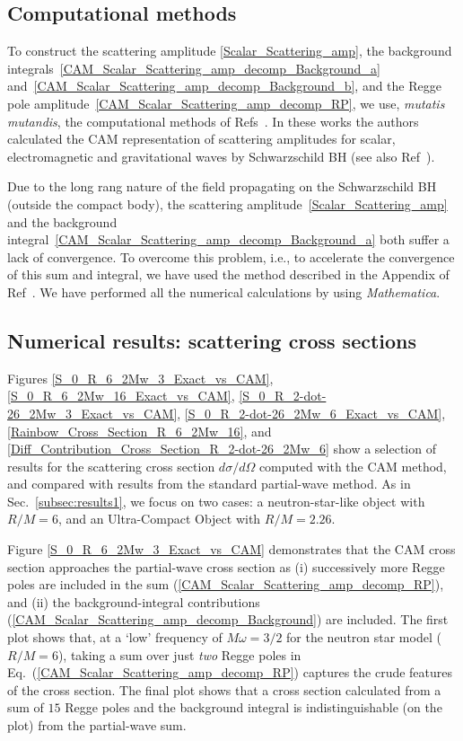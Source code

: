 \documentclass[aps,prd,longbibliography,reprint,twocolumn,amsmath,amssymb,amsfonts,showpacs,superscriptaddress]{revtex4-1}%
\begin{document}
\subsection{Computational methods}
\label{SecIIIa}

To construct the scattering amplitude \eqref{Scalar_Scattering_amp}, the background integrals~\eqref{CAM_Scalar_Scattering_amp_decomp_Background_a} and~\eqref{CAM_Scalar_Scattering_amp_decomp_Background_b}, and the Regge pole amplitude~\eqref{CAM_Scalar_Scattering_amp_decomp_RP}, we use, \textit{mutatis mutandis}, the computational methods of Refs~\cite{Folacci:2019cmc,Folacci:2019vtt}. In these works the authors calculated the CAM representation of scattering amplitudes for scalar, electromagnetic and gravitational waves by Schwarzschild BH (see also Ref~\cite{Dolan:2017rtj}). 

Due to the long rang nature of the field propagating on the Schwarzschild BH (outside the compact body), the scattering amplitude~\eqref{Scalar_Scattering_amp} and the background integral~\eqref{CAM_Scalar_Scattering_amp_decomp_Background_a} both suffer a lack of convergence. To overcome this problem, i.e., to accelerate the convergence of this sum and integral, we have used the method described in the Appendix of Ref~\cite{Folacci:2019cmc}. We have performed all the numerical calculations by using {\it Mathematica}. %


\subsection{Numerical results: scattering cross sections}
\label{subsec:results2}

Figures \ref{S_0_R_6_2Mw_3_Exact_vs_CAM}, \ref{S_0_R_6_2Mw_16_Exact_vs_CAM}, \ref{S_0_R_2-dot-26_2Mw_3_Exact_vs_CAM}, \ref{S_0_R_2-dot-26_2Mw_6_Exact_vs_CAM}, \ref{Rainbow_Cross_Section_R_6_2Mw_16}, and \ref{Diff_Contribution_Cross_Section_R_2-dot-26_2Mw_6} show a selection of results for the scattering cross section $d\sigma / d\Omega$ computed with the CAM method, and compared with results from the standard partial-wave method. As in Sec.~\ref{subsec:results1}, we focus on two cases: a neutron-star-like object with $R/M = 6$, and an Ultra-Compact Object with $R/M = 2.26$. 

Figure \ref{S_0_R_6_2Mw_3_Exact_vs_CAM} demonstrates that the CAM cross section approaches the partial-wave cross section as (i) successively more Regge poles are included in the sum (\ref{CAM_Scalar_Scattering_amp_decomp_RP}), and (ii) the background-integral contributions (\ref{CAM_Scalar_Scattering_amp_decomp_Background}) are included. The first plot shows that, at a `low' frequency of $M \omega = 3/2$ for the neutron star model ($R/M = 6$), taking a sum over just \emph{two} Regge poles in Eq.~(\ref{CAM_Scalar_Scattering_amp_decomp_RP}) captures the crude features of the cross section. The final plot shows that a cross section calculated from a sum of $15$ Regge poles and the background integral is indistinguishable (on the plot) from the partial-wave sum.
\end{document}
